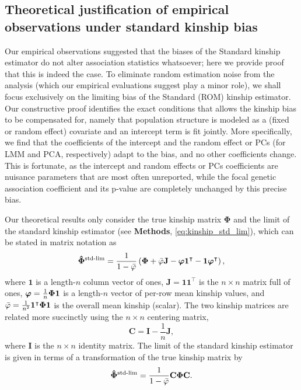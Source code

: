 \documentclass[11pt]{article}
\newcommand{\kinMat}{%
  \ensuremath{%
    \mathbf{\Phi}
  }%
  \xspace%
}%
\newcommand{\kinMatEstNamed}[1]{%
  \ensuremath{%
    \mathbf{\hat{\Phi}}^\text{#1}
  }%
  \xspace%
}%
\newcommand{\kinMatStdLim}{%
  \kinMatEstNamed{std-lim}
}%
\begin{document}
\subsection{Theoretical justification of empirical observations under standard kinship bias}

Our empirical observations suggested that the biases of the Standard kinship estimator do not alter association statistics whatsoever; here we provide proof that this is indeed the case.
To eliminate random estimation noise from the analysis (which our empirical evaluations suggest play a minor role), we shall focus exclusively on the limiting bias of the Standard (ROM) kinship estimator.
Our constructive proof identifies the exact conditions that allows the kinship bias to be compensated for, namely that population structure is modeled as a (fixed or random effect) covariate and an intercept term is fit jointly.
More specifically, we find that the coefficients of the intercept and the random effect or PCs (for LMM and PCA, respectively) adapt to the bias, and no other coefficients change.
This is fortunate, as the intercept and random effects or PCs coefficients are nuisance parameters that are most often unreported, while the focal genetic association coefficient and its p-value are completely unchanged by this precise bias.

Our theoretical results only consider the true kinship matrix \kinMat and the limit of the standard kinship estimator (see \textbf{Methods}, \cref{eq:kinship_std_lim}), which can be stated in matrix notation as
$$
\kinMatStdLim
=
\frac{1}{1 - \bar{\varphi}}
\left(
  \kinMat
  + \bar{\varphi} \mathbf{J}
  - \boldsymbol{\varphi} \mathbf{1}^\intercal 
  - \mathbf{1} \boldsymbol{\varphi}^\intercal 
\right)
,
$$
where
$\mathbf{1}$ is a length-$n$ column vector of ones,
$\mathbf{J} = \mathbf{1} \mathbf{1}^\intercal$ is the $n \times n$ matrix full of ones,
$\boldsymbol{\varphi} = \frac{1}{n} \kinMat \mathbf{1}$ is a length-$n$ vector of per-row mean kinship values, and
$\bar{\varphi} = \frac{1}{n^2} \mathbf{1}^\intercal \kinMat \mathbf{1}$ is the overall mean kinship (scalar).
The two kinship matrices are related more succinctly using the $n \times n$ centering matrix,
$$
\mathbf{C}
=
\mathbf{I} - \frac{1}{n} \mathbf{J},
$$
where $\mathbf{I}$ is the $n \times n$ identity matrix.
The limit of the standard kinship estimator is given in terms of a transformation of the true kinship matrix by
\begin{equation}
  \label{eq:kin-std-lim-C}
  \kinMatStdLim
  =
  \frac{1}{1 - \bar{\varphi}}
  \mathbf{C} \kinMat \mathbf{C}
  .
\end{equation}
\end{document}
